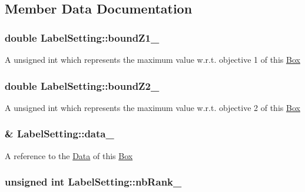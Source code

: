 \subsection{\-Member \-Data \-Documentation}
\hypertarget{classLabelSetting_a23a2c84d5807bdbcff3e79789b1f25db}{
\subsubsection[{bound\-Z1\-\_\-}]{\setlength{\rightskip}{0pt plus 5cm}double {\bf \-Label\-Setting\-::bound\-Z1\-\_\-}}}\label{classLabelSetting_a23a2c84d5807bdbcff3e79789b1f25db}
\-A unsigned int which represents the maximum value w.\-r.\-t. objective 1 of this {\ttfamily \hyperlink{classBox}{\-Box}} \hypertarget{classLabelSetting_a7ac9a4f88bd4c88778900193e109ce5a}{
\subsubsection[{bound\-Z2\-\_\-}]{\setlength{\rightskip}{0pt plus 5cm}double {\bf \-Label\-Setting\-::bound\-Z2\-\_\-}}}\label{classLabelSetting_a7ac9a4f88bd4c88778900193e109ce5a}
\-A unsigned int which represents the maximum value w.\-r.\-t. objective 2 of this {\ttfamily \hyperlink{classBox}{\-Box}} \hypertarget{classLabelSetting_af517a2381429109440d3c0f8e9f0fa7f}{
\subsubsection[{data\-\_\-}]{\& {\bf \-Label\-Setting\-::data\-\_\-}}}\label{classLabelSetting_af517a2381429109440d3c0f8e9f0fa7f}
\-A reference to the {\ttfamily \hyperlink{classData}{\-Data}} of this {\ttfamily \hyperlink{classBox}{\-Box}} \hypertarget{classLabelSetting_a69d4e0ff00df89700f653088a399bfce}{
\subsubsection[{nb\-Rank\-\_\-}]{\setlength{\rightskip}{0pt plus 5cm}unsigned int {\bf \-Label\-Setting\-::nb\-Rank\-\_\-}}}\label{classLabelSetting_a69d4e0ff00df89700f653088a399bfce}

